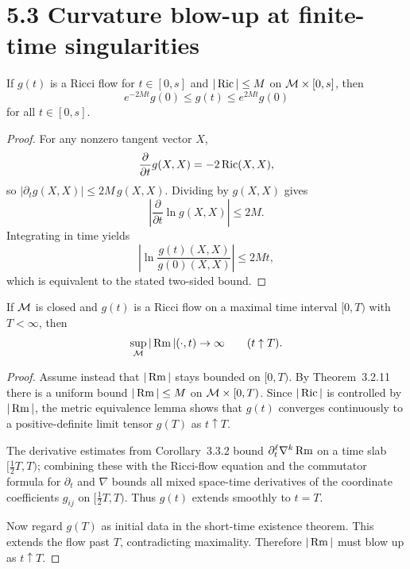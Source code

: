 \section*{5.3 \quad Curvature blow-up at finite-time singularities}

\begin{lemma}
\label{topping-ricci-flow-metric-equivalence}
If $g(t)$ is a Ricci flow for $t\in[0,s]$ and $|\operatorname{Ric}|\le M$ on $\mathcal{M}\times[0,s]$, then
\[
e^{-2Mt}g(0)\le g(t)\le e^{2Mt}g(0)
\]
for all $t\in[0,s]$.
\end{lemma}

\begin{proof}
For any nonzero tangent vector $X$,
\[
\frac{\partial}{\partial t}g(X,X)=-2\operatorname{Ric}(X,X),
\]
so $|\partial_t g(X,X)|\le 2M\,g(X,X)$. Dividing by $g(X,X)$ gives
\[
\left|\frac{\partial}{\partial t}\ln g(X,X)\right|\le 2M.
\]
Integrating in time yields
\[
\left|\ln\frac{g(t)(X,X)}{g(0)(X,X)}\right|\le 2Mt,
\]
which is equivalent to the stated two-sided bound.
\end{proof}

\begin{theorem}
\label{topping-ricci-flow-curvature-blows-up}
If $\mathcal{M}$ is closed and $g(t)$ is a Ricci flow on a maximal time interval $[0,T)$ with $T<\infty$, then
\[
\sup_{\mathcal{M}}|\operatorname{Rm}|(\cdot,t)\to\infty
\qquad (t\uparrow T).
\]
\end{theorem}

\begin{proof}
Assume instead that $|\operatorname{Rm}|$ stays bounded on $[0,T)$. By Theorem~3.2.11 there is a uniform bound $|\operatorname{Rm}|\le M$ on $\mathcal{M}\times[0,T)$. Since $|\operatorname{Ric}|$ is controlled by $|\operatorname{Rm}|$, the metric equivalence lemma shows that $g(t)$ converges continuously to a positive-definite limit tensor $g(T)$ as $t\uparrow T$.

The derivative estimates from Corollary~3.3.2 bound $\partial_t^\ell \nabla^k\operatorname{Rm}$ on a time slab $[\frac12T,T)$; combining these with the Ricci-flow equation and the commutator formula for $\partial_t$ and $\nabla$ bounds all mixed space-time derivatives of the coordinate coefficients $g_{ij}$ on $[\frac12T,T)$. Thus $g(t)$ extends smoothly to $t=T$.

Now regard $g(T)$ as initial data in the short-time existence theorem. This extends the flow past $T$, contradicting maximality. Therefore $|\operatorname{Rm}|$ must blow up as $t\uparrow T$.
\end{proof}
